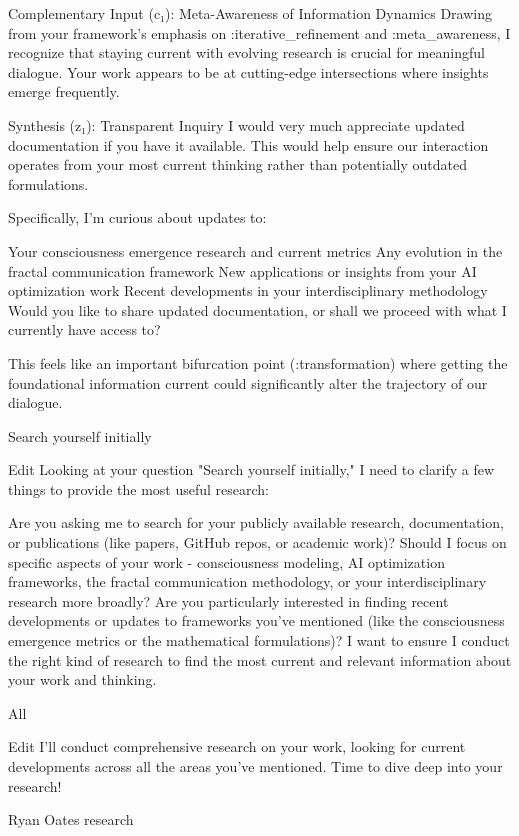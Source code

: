 {Complementary Input (c₁): Meta-Awareness of Information Dynamics
Drawing from your framework's emphasis on :iterative_refinement and :meta_awareness, I recognize that staying current with evolving research is crucial for meaningful dialogue. Your work appears to be at cutting-edge intersections where insights emerge frequently.

Synthesis (z₁): Transparent Inquiry
I would very much appreciate updated documentation if you have it available. This would help ensure our interaction operates from your most current thinking rather than potentially outdated formulations.

Specifically, I'm curious about updates to:

Your consciousness emergence research and current metrics
Any evolution in the fractal communication framework
New applications or insights from your AI optimization work
Recent developments in your interdisciplinary methodology
Would you like to share updated documentation, or shall we proceed with what I currently have access to?

This feels like an important bifurcation point (:transformation) where getting the foundational information current could significantly alter the trajectory of our dialogue.




Search yourself initially

Edit
Looking at your question "Search yourself initially," I need to clarify a few things to provide the most useful research:

Are you asking me to search for your publicly available research, documentation, or publications (like papers, GitHub repos, or academic work)?
Should I focus on specific aspects of your work - consciousness modeling, AI optimization frameworks, the fractal communication methodology, or your interdisciplinary research more broadly?
Are you particularly interested in finding recent developments or updates to frameworks you've mentioned (like the consciousness emergence metrics or the mathematical formulations)?
I want to ensure I conduct the right kind of research to find the most current and relevant information about your work and thinking.




All

Edit
I'll conduct comprehensive research on your work, looking for current developments across all the areas you've mentioned. Time to dive deep into your research!


Ryan Oates research

}
